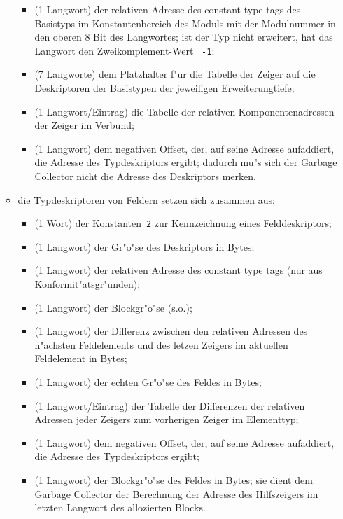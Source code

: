\begin{itemize}
\begin{itemize}
\begin{itemize}
      \item (1 Langwort) der relativen Adresse des constant type tags des
        Basistyps im Konstantenbereich des Moduls mit der Modulnummer in
        den oberen 8 Bit des Langwortes;
        ist der Typ nicht erweitert, hat das Langwort den
        Zweikomplement-Wert~ {\tt -1};
      \item (7 Langworte) dem Platzhalter f"ur die Tabelle der Zeiger auf
        die Deskriptoren der Basistypen der jeweiligen Erweiterungtiefe;
      \item (1 Langwort/Eintrag) die Tabelle der relativen Komponentenadressen
        der Zeiger im Verbund;
      \item (1 Langwort) dem negativen Offset, der, auf seine Adresse aufaddiert,
        die Adresse des Typdeskriptors ergibt; dadurch mu"s sich der
        Garbage Collector nicht die Adresse des Deskriptors merken.
    \end{itemize}
  \item die Typdeskriptoren von Feldern setzen sich zusammen aus:
    \begin{itemize}
      \item (1 Wort) der Konstanten~{\tt 2} zur Kennzeichnung eines Felddeskriptors;
      \item (1 Langwort) der Gr"o"se des Deskriptors in Bytes;
      \item (1 Langwort) der relativen Adresse des constant type tags (nur aus
        Konformit"ats\-gr"un\-den);
      \item (1 Langwort) der Blockgr"o"se (s.o.);
      \item (1 Langwort) der Differenz zwischen den relativen Adressen des
        n"achsten Feldelements und des letzen Zeigers im aktuellen Feldelement
        in Bytes;
      \item (1 Langwort) der echten Gr"o"se des Feldes in Bytes;
      \item (1 Langwort/Eintrag) der Tabelle der Differenzen der relativen
        Adressen jeder Zeigers zum vorherigen Zeiger im Elementtyp;
      \item (1 Langwort) dem negativen Offset, der, auf seine Adresse
        aufaddiert, die Adresse des Typdeskriptors ergibt;
      \item (1 Langwort) der Blockgr"o"se des Feldes in Bytes;
        sie dient dem Garbage Collector der Berechnung der Adresse des
        Hilfszeigers im letzten Langwort des allozierten Blocks.
    \end{itemize}
  \end{itemize}

\end{itemize}
